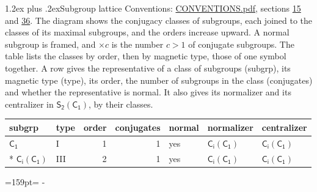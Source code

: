 \documentclass[10pt,a4paper]{article}
\makeatletter
\renewcommand\section{\@startsection{section}{1}{\z@}{-3ex plus -1ex minus -.2ex}%
  {1.2ex plus .2ex}{\normalfont\large\sffamily\bfseries\color{parttitle}}}
\newcommand{\needspace}[1]{\par\penalty-100\begingroup\dimen0=#1\relax\dimen2=\pagegoal
  \advance\dimen2-\pagetotal\ifdim\dimen0>\dimen2\relax\ifdim\dimen2>0pt\vfil\break\fi\fi
  \endgroup}
\numberwithin{equation}{section}
\newcommand{\grp}[1]{\mathsf{#1}}
\makeatother
\begin{document}
\section{Subgroup lattice}\label{s:subgroups}
Conventions: \href{../../CONVENTIONS.pdf}{CONVENTIONS.pdf}, sections \href{../../../rotation/CONVENTIONS.pdf\#conv.15}{15} and \href{../../CONVENTIONS.pdf\#conv.36}{36}.
The diagram shows the conjugacy classes of subgroups, each joined to the classes of its maximal subgroups, and the orders increase upward. \label{n:index.conjugates.c}A normal subgroup is framed, and ${\times}c$ is the number $c > 1$ of conjugate subgroups. The table lists the classes by order, then by magnetic type, those of one symbol together. \label{n:head.subgroup}\label{n:head.magnetic.type}\label{n:head.order}\label{n:head.conjugates}\label{n:head.normal}A row gives the representative of a class of subgroups (subgrp), its magnetic type (type), its order, the number of subgroups in the class (conjugates) and whether the representative is normal. \label{n:head.normalizer}\label{n:head.centralizer}It also gives its normalizer and its centralizer in $\grp{S_{2}}(\grp{C_{1}})$, by their classes. 
\begin{center}
\end{center}
{\small\begin{longtable}{@{}llrrlll@{}}\toprule
subgrp & type & order & conjugates & normal & normalizer & centralizer\\\midrule\endhead
\bottomrule\endfoot\endlastfoot
\href{../../../rotation/data/pdf/C1.pdf}{$\grp{C_{1}}$} & I & 1 & 1 & yes & \href{S2-C1.pdf}{$\grp{C_{i}}(\grp{C_{1}})$} & \href{S2-C1.pdf}{$\grp{C_{i}}(\grp{C_{1}})$}\\*
\href{S2-C1.pdf}{$\grp{C_{i}}(\grp{C_{1}})$} & III & 2 & 1 & yes & \href{S2-C1.pdf}{$\grp{C_{i}}(\grp{C_{1}})$} & \href{S2-C1.pdf}{$\grp{C_{i}}(\grp{C_{1}})$}\\
\bottomrule\end{longtable}}
\needspace{159pt}
\end{document}
